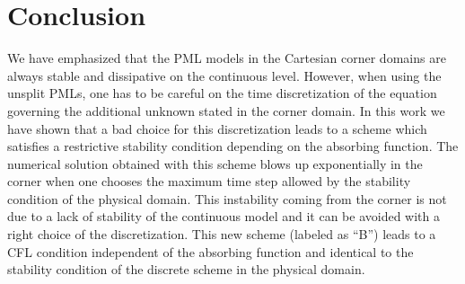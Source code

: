 \documentclass[a4paper]{article}
\begin{document}
\section*{Conclusion} 
We have emphasized that the PML models in the Cartesian corner domains 
are always stable and dissipative on the continuous level. However, when
using the unsplit PMLs, one has to be careful on the time discretization
of the equation governing the additional  unknown stated in the corner 
domain. In this work we have shown that a bad choice for this 
discretization leads to a scheme which satisfies a restrictive stability
condition depending on the absorbing function. The numerical solution 
obtained with this scheme blows up exponentially in the corner when one
chooses the maximum time step  allowed by the  stability condition of 
the physical domain. This instability coming from the corner is not due
to a lack of stability of the continuous model and it can be avoided with 
a right choice of the discretization. This new scheme (labeled as ``B'')
leads to a CFL condition independent of the absorbing function and identical
to the stability condition of the discrete scheme in the physical domain.

 
\end{document}
